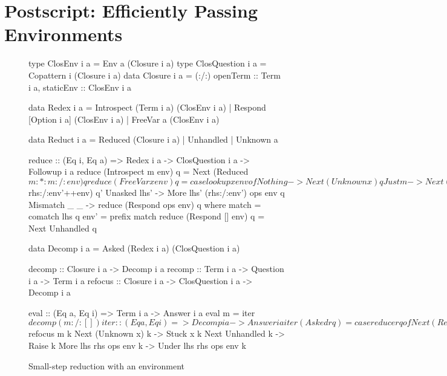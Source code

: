 \section{Postscript: Efficiently Passing Environments}
\label{sec:environment-machine}

\begin{figure}
\centering
\renewcommand{\basicstylesize}{\footnotesize}
\begin{haskell}
type ClosEnv i a = Env a (Closure i a)
type ClosQuestion i a
  = Copattern i (Closure i a)
data Closure i a
  = (:/:) { openTerm  :: Term i a,
            staticEnv :: ClosEnv i a }

data Redex i a
  = Introspect (Term i a) (ClosEnv i a)
  | Respond [Option i a] (ClosEnv i a)
  | FreeVar a (ClosEnv i a)

data Reduct i a
  = Reduced (Closure i a)
  | Unhandled
  | Unknown a

reduce :: (Eq i, Eq a)
       => Redex i a -> ClosQuestion i a
       -> Followup i a
reduce (Introspect m env) q
  = Next (Reduced $ m :*: m :/: env) q
reduce (FreeVar x env)    q
  = case lookup x env of
  Nothing -> Next (Unknown x) q
  Just m  -> Next (Reduced m) q
reduce (Respond (lhs :-> rhs : ops) env) q
  = case suffix match of
      Followup q'  ->
        Next (Reduced $ rhs:/:env'++env) q'
      Unasked lhs' ->
        More lhs' (rhs:/:env') ops env q
      Mismatch _ _ ->
        reduce (Respond ops env) q
  where match = comatch lhs q
        env'  = prefix match
reduce (Respond [] env)   q
  = Next Unhandled q

data Decomp i a
  = Asked (Redex i a) (ClosQuestion i a)

decomp  :: Closure i a -> Decomp i a
recomp  :: Term i a -> Question i a -> Term i a
refocus :: Closure i a -> ClosQuestion i a
        -> Decomp i a

eval :: (Eq a, Eq i) => Term i a -> Answer i a
eval m = iter $ decomp (m :/: [])

iter :: (Eq a, Eq i) => Decomp i a -> Answer i a
iter (Asked r q) = case reduce r q of
  Next (Reduced m)     k -> iter $ refocus m k
  Next (Unknown x)     k -> Stuck x k
  Next Unhandled       k -> Raise k
  More lhs rhs ops env k -> Under lhs rhs ops env k
\end{haskell}
\caption{Small-step reduction with an environment}
\label{fig:block-env-reduce-code}
\end{figure}

